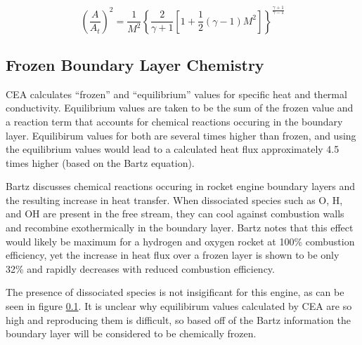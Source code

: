 \documentclass[11pt]{article}
\begin{document}
\begin{equation}
    \left( \frac{A}{A_t}\right)^2 = \frac{1}{M^2} \left\{ \frac{2}{\gamma + 1} \left[ 1 + \frac{1}{2} (\gamma - 1) M^2 \right] \right\}^{\frac{\gamma + 1}{\gamma - 1}}
\end{equation}

\subsection{Frozen Boundary Layer Chemistry}

CEA calculates ``frozen'' and ``equilibrium'' values for specific heat and thermal conductivity. Equilibrium values are taken to be the sum of the frozen value and a reaction term that accounts for chemical reactions occuring in the boundary layer. Equilibirum values for both are several times higher than frozen, and using the equilibrium values would lead to a calculated heat flux approximately 4.5 times higher (based on the Bartz equation).

Bartz \cite{page 46} discusses chemical reactions occuring in rocket engine boundary layers and the resulting increase in heat transfer. When dissociated species such as O, H, and OH are present in the free stream, they can cool against combustion walls and recombine exothermically in the boundary layer. Bartz notes that this effect would likely be maximum for a hydrogen and oxygen rocket at 100\% combustion efficiency, yet the increase in heat flux over a frozen layer is shown to be only 32\% and rapidly decreases with reduced combustion efficiency.

The presence of dissociated species is not insigificant for this engine, as can be seen in figure \ref{}. It is unclear why equilibirum values calculated by CEA are so high and reproducing them is difficult, so based off of the Bartz information the boundary layer will be considered to be chemically frozen.
\end{document}
